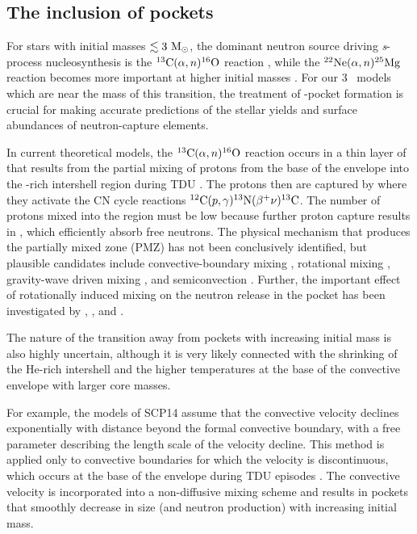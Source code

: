 \subsection{The inclusion of  pockets}\label{sec:pmz}
For stars with initial masses $\lesssim 3\ \Msun$, the dominant neutron source driving \textit{s}-process nucleosynthesis is the $\mbox{${}^{13}{\text{C}}$}(\alpha,n)\mbox{${}^{16}{\text{O}}$}$ reaction \citep{Busso:1999ig}, while the $\mbox{${}^{22}{\text{Ne}}$}(\alpha,n)\mbox{${}^{25}{\text{Mg}}$}$ reaction becomes more important at higher initial masses \citep{GarciaHernandez:2013ko}. For our 3 \Msun\ models which are near the mass of this transition, the treatment of -pocket formation is crucial for making accurate predictions of the stellar yields and surface abundances of neutron-capture elements.

In current theoretical models, the $\mbox{${}^{13}{\text{C}}$}(\alpha,n)\mbox{${}^{16}{\text{O}}$}$ reaction occurs in a thin layer of  that results from the partial mixing of protons from the base of the envelope into the -rich intershell region during TDU \citep{Straniero:1995ed,Gallino:1998eg}. The protons then are captured by  where they activate the CN cycle reactions $\mbox{${}^{12}{\text{C}}$}(p,\gamma)\mbox{${}^{13}{\text{N}}$}(\beta^+\nu)\mbox{${}^{13}{\text{C}}$}$. The number of protons mixed into the region must be low because further proton capture results in , which efficiently absorb free neutrons. The physical mechanism that produces the partially mixed zone (PMZ) has not been conclusively identified, but plausible candidates include convective-boundary mixing \citep{Herwig:2000ua,Cristallo:2009kn}, rotational mixing \citep{Langer:1999tj,Herwig:2001vb}, gravity-wave driven mixing \citep{Denissenkov:2003gx}, and semiconvection \citep{Iben:1982cv,Hollowell:1989bd}. Further, the important effect of rotationally induced mixing on the neutron release in the  pocket has been investigated by \citet{Herwig:2003du}, \citet{Siess:2004eh}, and \citet{Piersanti:2013dh}.

The nature of the transition away from  pockets with increasing initial mass is also highly uncertain, although it is very likely connected with the shrinking of the He-rich intershell and the higher temperatures at the base of the convective envelope with larger core masses.

For example, the models of SCP14 assume that the convective velocity declines exponentially with distance beyond the formal convective boundary, with a free parameter describing the length scale of the velocity decline. This method is applied only to convective boundaries for which the velocity is discontinuous, which occurs at the base of the envelope during TDU episodes \citep{Cristallo:2009kn}. The convective velocity is incorporated into a non-diffusive mixing scheme \citep{Straniero:2006do} and results in  pockets that smoothly decrease in size (and neutron production) with increasing initial mass.

